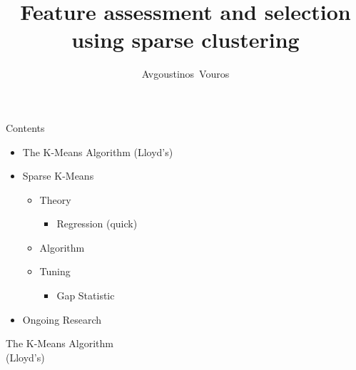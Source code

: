 \documentclass{beamer}
\title{Feature assessment and selection using sparse clustering}
\author{Avgoustinos~Vouros\inst{1}}
\institute[] %
{
  \inst{1}%
  PhD student, \\Department of Computer Science,\\
  University of Sheffield\\
  \vspace{5mm}
  \noindent Supervised by Prof Eleni Vasilaki
}
\date{} %
\newlength{\tmpShadow}
\newcommand{\MyShadow}[2]{%
	\settowidth{\tmpShadow}{#1}
	\addtolength{\tmpShadow}{.1em}
	\raisebox{-0.25ex}{\textcolor{gray!70}{#1}}%
	\kern-\tmpShadow%
	\textcolor{#2}{#1}%
}
\begin{document}
\begin{frame}
  \titlepage
\end{frame}



\begin{frame}{Contents}
	\begin{itemize}[label={\MyShadow{$\bullet$}{black!80}}]
		\item The K-Means Algorithm (Lloyd's)
		\vspace{3mm}
		\item Sparse K-Means
		\vspace{3mm}
		\begin{itemize}[label={\MyShadow{$\bullet$}{black!80}}]
			\item Theory
			\begin{itemize}[label={\MyShadow{$\star$}{black!80}}]
				\item Regression (quick)
			\end{itemize}	
			\vspace{3mm}
			\item Algorithm
			\vspace{3mm}
			\item Tuning
			\begin{itemize}[label={\MyShadow{$\star$}{black!80}}]
				\item Gap Statistic
			\end{itemize}				
		\end{itemize}
		\vspace{1mm}
		\item Ongoing Research
	\end{itemize}
\end{frame}


\begin{frame}[plain,c]
	\vspace{1mm}
	\begin{center}
		\Huge The K-Means Algorithm\\
		\Huge (Lloyd's)
	\end{center}
\end{frame}
\end{document}
